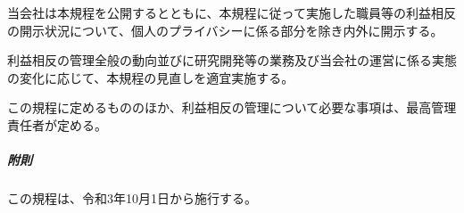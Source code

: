 \documentclass[10pt,a4paper,uplatex]{jsarticle}
\begin{document}
当会社は本規程を公開するとともに、本規程に従って実施した職員等の利益相反の開示状況について、個人のプライバシーに係る部分を除き内外に開示する。

利益相反の管理全般の動向並びに研究開発等の業務及び当会社の運営に係る実態の変化に応じて、本規程の見直しを適宜実施する。

この規程に定めるもののほか、利益相反の管理について必要な事項は、最高管理責任者が定める。

\vspace{1cm}
\subparagraph{附則}
この規程は、令和3年10月1日から施行する。
\end{document}
